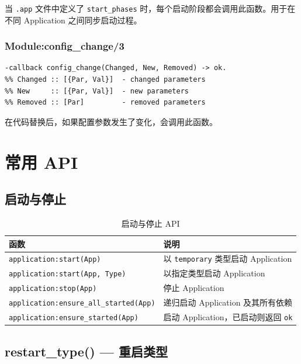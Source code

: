 \documentclass[a4paper,11pt]{article}
\begin{document}
当 \texttt{.app} 文件中定义了 \texttt{start\_phases} 时，每个启动阶段都会调用此函数。用于在不同 Application 之间同步启动过程。

\subsubsection{Module:config\_change/3}

\begin{lstlisting}[style=erlangstyle]
-callback config_change(Changed, New, Removed) -> ok.
%% Changed :: [{Par, Val}]  - changed parameters
%% New     :: [{Par, Val}]  - new parameters
%% Removed :: [Par]         - removed parameters
\end{lstlisting}

在代码替换后，如果配置参数发生了变化，会调用此函数。


\section{常用 API}

\subsection{启动与停止}

\begin{table}[H]
\centering
\begin{tabular}{@{}lp{8cm}@{}}
\toprule
\textbf{函数} & \textbf{说明} \\
\midrule
\texttt{application:start(App)} & 以 \texttt{temporary} 类型启动 Application \\
\texttt{application:start(App, Type)} & 以指定类型启动 Application \\
\texttt{application:stop(App)} & 停止 Application \\
\texttt{application:ensure\_all\_started(App)} & 递归启动 Application 及其所有依赖 \\
\texttt{application:ensure\_started(App)} & 启动 Application，已启动则返回 \texttt{ok} \\
\bottomrule
\end{tabular}
\caption{启动与停止 API}
\end{table}

\subsection{restart\_type() --- 重启类型}
\end{document}

